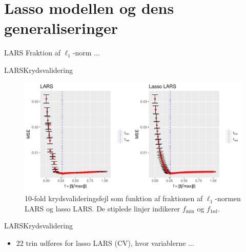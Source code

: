 \section{Lasso modellen og dens generaliseringer}
\begin{frame}{LARS}
Fraktion af \(\ell_1\)-norm ...
\end{frame}


\begin{frame}{LARS}{Krydsvalidering}
\begin{figure}
 \includegraphics[width=1\linewidth, height=0.7\textheight]{slides/lars_kryds.pdf}
 \caption{10-fold krydsvalideringsfejl som funktion af fraktionen af \(\ell_1\)-normen LARS og lasso LARS. 
De stiplede linjer indikerer \(f_\text{min}\) og \(f_\text{1sd}\).}
 \end{figure}
\end{frame}


\begin{frame}{LARS}{Krydsvalidering}
\begin{table}
\center
{}
\caption{Værdien af $f_{\min}$ og $f_{1\text{sd}}$, gennemsnitlig krydsvalideringsfejl, som er målt i MSE, antallet af parametre, justeret R$^2$ og log-likelihood for LARS og lasso LARS. De valgte tuning parametre er markeret med tykt.} \label{tab:lars_lasso_tab}
\end{table}
\begin{itemize}
\item 22 trin udføres for lasso LARS (CV), hvor variablerne ...
\end{itemize}
\end{frame}

